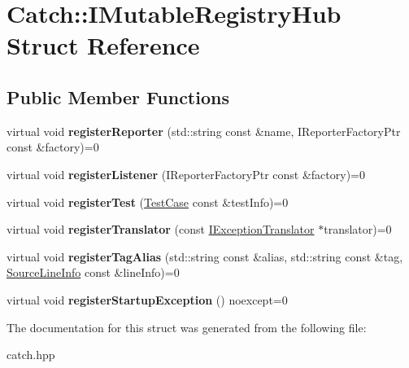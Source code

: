 \hypertarget{structCatch_1_1IMutableRegistryHub}{}\section{Catch\+:\+:I\+Mutable\+Registry\+Hub Struct Reference}
\label{structCatch_1_1IMutableRegistryHub}
\subsection*{Public Member Functions}
\begin{DoxyCompactItemize}
\item 
\mbox{\label{structCatch_1_1IMutableRegistryHub_a1c0ac202ac31ee9f88e8ff5cbac4b243}} 
virtual void {\bfseries register\+Reporter} (std\+::string const \&name, I\+Reporter\+Factory\+Ptr const \&factory)=0
\item 
\mbox{\label{structCatch_1_1IMutableRegistryHub_abd892a133f85581fd00ee75bb379ca56}} 
virtual void {\bfseries register\+Listener} (I\+Reporter\+Factory\+Ptr const \&factory)=0
\item 
\mbox{\label{structCatch_1_1IMutableRegistryHub_a11b85c6744d88c9f83fe16ad4a8dd451}} 
virtual void {\bfseries register\+Test} (\hyperlink{classCatch_1_1TestCase}{Test\+Case} const \&test\+Info)=0
\item 
\mbox{\label{structCatch_1_1IMutableRegistryHub_ae6825365102693cf7707db022a2c2b49}} 
virtual void {\bfseries register\+Translator} (const \hyperlink{structCatch_1_1IExceptionTranslator}{I\+Exception\+Translator} $\ast$translator)=0
\item 
\mbox{\label{structCatch_1_1IMutableRegistryHub_abf2e386b6f94f615719ada711adbf822}} 
virtual void {\bfseries register\+Tag\+Alias} (std\+::string const \&alias, std\+::string const \&tag, \hyperlink{structCatch_1_1SourceLineInfo}{Source\+Line\+Info} const \&line\+Info)=0
\item 
\mbox{\label{structCatch_1_1IMutableRegistryHub_a72a7d5386851ac3200f8da794a009c86}} 
virtual void {\bfseries register\+Startup\+Exception} () noexcept=0
\end{DoxyCompactItemize}


The documentation for this struct was generated from the following file\+:\begin{DoxyCompactItemize}
\item 
catch.\+hpp\end{DoxyCompactItemize}

